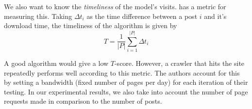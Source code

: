 
We also want to know the \emph{timeliness} of the model's visits.  
 has a metric for measuring this. Taking $\Delta t_i$ as the 
time difference between a post $i$ and it's download time, the timeliness of the 
algorithm is given by
\[
	T = \frac{1}{|P|} \sum^{|P|}_{i=1}\Delta t_i
\]

A good algorithm would give a low $T$-score. However, a crawler that hits the 
site repeatedly performs well according to this metric. The authors account for 
this by setting a bandwidth (fixed number of pages per day) for each iteration 
of their testing. In our experimental results, we also take into account the 
number of page requests made in comparison to the number of posts. %

%

